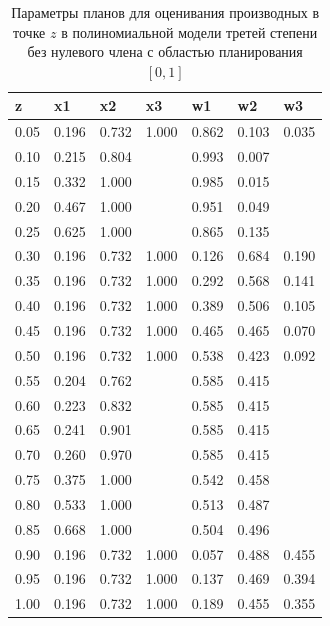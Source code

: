 \documentclass[specialist,
               substylefile = spbu.rtx,
               subf,href,colorlinks=true, 12pt]{disser}
\theoremstyle{definition}
\begin{document}
\begin{table}[]

\centering
\begin{tabular}{l|llllll}
z    & x1    & x2    & x3    & w1    & w2      & w3     \\ \hline
\rowcolor[HTML]{C0C0C0} 
0.05 & 0.196 & 0.732 & 1.000 & 0.862 & 0.103 & 0.035 \\
0.10 & 0.215 & 0.804 &       & 0.993 & 0.007 &        \\
0.15 & 0.332 & 1.000 &       & 0.985 & 0.015 &        \\
0.20 & 0.467 & 1.000 &       & 0.951 & 0.049 &        \\
0.25 & 0.625 & 1.000 &       & 0.865 & 0.135 &        \\
\rowcolor[HTML]{C0C0C0} 
0.30 & 0.196 & 0.732 & 1.000 & 0.126 & 0.684 & 0.190 \\
\rowcolor[HTML]{C0C0C0} 
0.35 & 0.196 & 0.732 & 1.000 & 0.292 & 0.568 & 0.141 \\
\rowcolor[HTML]{C0C0C0} 
0.40 & 0.196 & 0.732 & 1.000 & 0.389 & 0.506 & 0.105 \\
\rowcolor[HTML]{C0C0C0} 
0.45 & 0.196 & 0.732 & 1.000 & 0.465 & 0.465 & 0.070 \\
\rowcolor[HTML]{C0C0C0} 
0.50 & 0.196 & 0.732 &  1.000     & 0.538 & 0.423 &  0.092      \\
0.55 & 0.204 & 0.762 &       & 0.585 & 0.415 &        \\
0.60 & 0.223 & 0.832 &       & 0.585 & 0.415 &        \\
0.65 & 0.241 & 0.901 &       & 0.585 & 0.415 &        \\
0.70 & 0.260 & 0.970 &       & 0.585 & 0.415   &        \\
0.75 & 0.375 & 1.000 &       & 0.542 & 0.458 &        \\
0.80 & 0.533 & 1.000 &       & 0.513 & 0.487 &        \\
0.85 & 0.668 & 1.000 &       & 0.504 & 0.496 &        \\
\rowcolor[HTML]{C0C0C0} 
0.90 & 0.196 & 0.732 & 1.000 & 0.057 & 0.488 & 0.455 \\
\rowcolor[HTML]{C0C0C0} 
0.95 & 0.196 & 0.732 & 1.000 & 0.137 & 0.469 & 0.394 \\
\rowcolor[HTML]{C0C0C0} 
1.00 & 0.196 & 0.732 & 1.000 & 0.189 & 0.455 & 0.355
\end{tabular}
\caption{Параметры планов для оценивания производных в точке $z$ в полиномиальной модели третей степени без нулевого члена с областью планирования $[0, 1]$}
\label{table:p3}
\end{table}
	
\end{document}

